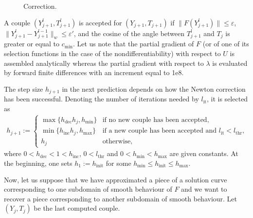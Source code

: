 \documentclass[a4paper,11pt,english]{sphinxmanual}
\begin{document}
\begin{figure}[htbp]
\centering
\capstart

\noindent{}
\caption{Correction.}\label{\detokenize{userdoc/model_continuation:id10}}\label{\detokenize{userdoc/model_continuation:ud-fig-correction}}\end{figure}

A couple \((Y_{j+1}^{l}, T_{j+1}^{l})\) is accepted for
\((Y_{j+1}, T_{j+1})\) if
\(\lVert F(Y_{j+1}^{l})\rVert \leq \varepsilon\),
\(\lVert Y_{j+1}^{l} - Y_{j+1}^{l-1}\rVert_{w} \leq \varepsilon'\), and the
cosine of the angle between \(T_{j+1}^{l}\) and \(T_{j}\) is greater or
equal to \(c_{\mathrm{min}}\). Let us note that the partial gradient of
\(F\) (or of one of its selection functions in the case of the
non\sphinxhyphen{}differentiability) with respect to \(U\) is assembled analytically
whereas the partial gradient with respect to \(\lambda\) is evaluated by
forward finite differences with an increment equal to 1e\sphinxhyphen{}8.

The step size \(h_{j+1}\) in the next prediction depends on how the Newton
correction has been successful. Denoting the number of iterations needed by
\(l_{\mathrm{it}}\), it is selected as
\begin{equation*}
\begin{split}h_{j+1} := \begin{cases}\max\{h_{\mathrm{dec}} h_{j}, h_{\mathrm{min}}\}& \text{if no new couple has been accepted},\\ \min\{h_{\mathrm{inc}} h_{j}, h_{\mathrm{max}}\}& \text{if a new couple has been accepted and } l_{\mathrm{it}} < l_{\mathrm{thr}},\\ h_{j}& \text{otherwise},\end{cases}\end{split}
\end{equation*}
where \(0 < h_{\mathrm{dec}} < 1 < h_{\mathrm{inc}}\),
\(0 < l_{\mathrm{thr}}\) and
\(0 < h_{\mathrm{min}} < h_{\mathrm{max}}\) are given constants. At the
beginning, one sets \(h_{1} := h_{\mathrm{init}}\) for some
\(h_{\mathrm{min}} \leq h_{\mathrm{init}} \leq h_{\mathrm{max}}\).

Now, let us suppose that we have approximated a piece of a solution curve
corresponding to one sub\sphinxhyphen{}domain of smooth behaviour of \(F\) and we want to
recover a piece corresponding to another sub\sphinxhyphen{}domain of smooth behaviour. Let
\((Y_{j},T_{j})\) be the last computed couple.
\end{document}
